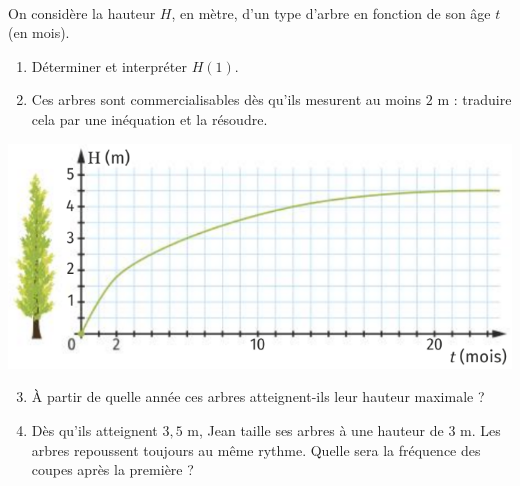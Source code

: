\documentclass[11pt]{article}
\begin{document}
\begin{exo}~\\[-2mm]
\begin{minipage}{.5\textwidth}
  On considère la hauteur $H$, en mètre, d'un type d'arbre en fonction de son
  \^age $t$ (en mois).
  \begin{enumerate}
    \item Déterminer et interpréter $H(1)$.
    \item Ces arbres sont commercialisables dès qu'ils mesurent au moins $2$ m :
      traduire cela par une inéquation et la résoudre.
  \end{enumerate}
\end{minipage}
\begin{minipage}{.5\textwidth}
  \begin{center}
    \includegraphics[scale=.35]{arbres.png}
  \end{center}
\end{minipage}
\begin{enumerate}
    \setcounter{enumi}{2}
  \item À partir de quelle année ces arbres atteignent-ils leur hauteur maximale
    ?
  \item Dès qu'ils atteignent $3,5$ m, Jean taille ses arbres à une hauteur de
    $3$ m. Les arbres repoussent toujours au même rythme. Quelle sera la
    fréquence des coupes après la première ?
\end{enumerate}
\end{exo}
\end{document}
